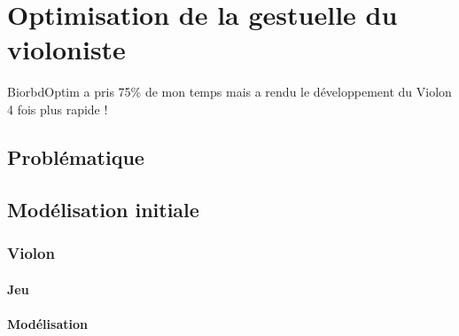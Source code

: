 \part{Optimisation de la gestuelle du violoniste}
\label{violon}

BiorbdOptim a pris 75\% de mon temps mais a rendu le développement du Violon 4 fois plus rapide !


% 
%     
% 
%     


    \chapter{Problématique}

    \chapter{Modélisation initiale}
        \section{Violon}
            \subsection{Jeu}
            \subsection{Modélisation}
            

